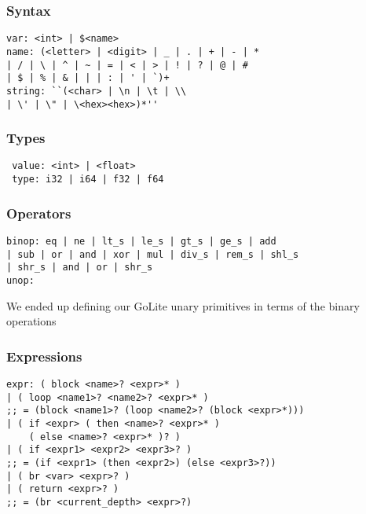 \documentclass{beamer}
\begin{document}

\begin{frame}[fragile]
\frametitle{Syntax}
\begin{verbatim}
var: <int> | $<name>
name: (<letter> | <digit> | _ | . | + | - | *
| / | \ | ^ | ~ | = | < | > | ! | ? | @ | #
| $ | % | & | | | : | ' | `)+
string: ``(<char> | \n | \t | \\
| \' | \" | \<hex><hex>)*''
\end{verbatim}
\end{frame}


\begin{frame}[fragile]
\frametitle{Types}

\begin{verbatim}
 value: <int> | <float>
 type: i32 | i64 | f32 | f64
\end{verbatim}

\end{frame}


\begin{frame}[fragile]
\frametitle{Operators}
\begin{verbatim}
binop: eq | ne | lt_s | le_s | gt_s | ge_s | add
| sub | or | and | xor | mul | div_s | rem_s | shl_s
| shr_s | and | or | shr_s
unop:
\end{verbatim}
We ended up defining our GoLite unary primitives in terms of the binary operations
\end{frame}


\begin{frame}[fragile]
\frametitle{Expressions}

\begin{verbatim}
expr: ( block <name>? <expr>* )
| ( loop <name1>? <name2>? <expr>* )         
;; = (block <name1>? (loop <name2>? (block <expr>*)))
| ( if <expr> ( then <name>? <expr>* )
	( else <name>? <expr>* )? )
| ( if <expr1> <expr2> <expr3>? )            
;; = (if <expr1> (then <expr2>) (else <expr3>?))
| ( br <var> <expr>? )
| ( return <expr>? )                         
;; = (br <current_depth> <expr>?)

\end{verbatim}

\end{frame}
\end{document}
